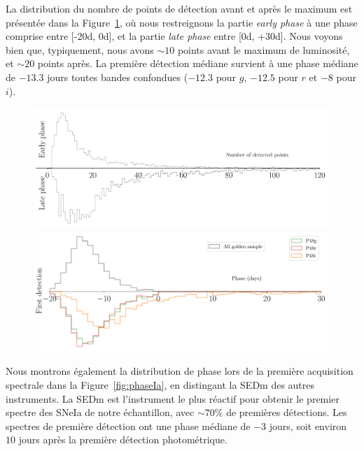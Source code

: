 \documentclass[../main/main.tex]{subfiles}
\begin{document}
La distribution du nombre de points de détection avant et après le
maximum est présentée dans la Figure~\ref{fig:earlylatephase}, où nous
restreignons la partie \textit{early phase} à une phase comprise entre
[-20d, 0d], et la partie \textit{late phase} entre [0d, +30d]. Nous
voyons bien que, typiquement, nous avons $\sim10$ points avant le
maximum de luminosité, et $\sim20$ points après. La première détection
médiane survient à une phase médiane de $-13.3$ jours toutes bandes
confondues ($-12.3$ pour $g$, $-12.5$ pour $r$ et $-8$ pour $i$).
\begin{figure}[ht!]
  \centering
  \includegraphics[width=0.99\textwidth]{../figures/09_dr2/early_late_phase_dr2.pdf}
  \includegraphics[width=0.99\textwidth]{../figures/09_dr2/first_detect_dr2.pdf}
  \caption[]{}
  \label{fig:earlylatephase}
\end{figure}


Nous montrons également la distribution de phase lors de la première
acquisition spectrale dans la Figure~\ref{fig:phaseIa}, en distingant la
SEDm des autres instruments. La SEDm est l'instrument
le plus réactif pour obtenir le premier spectre des SNeIa de notre
échantillon, avec $\sim70\%$ de premières détections. Les spectres
de première détection ont une phase médiane de $-3$ jours, soit environ
$10$ jours après la première détection photométrique.
\end{document}
